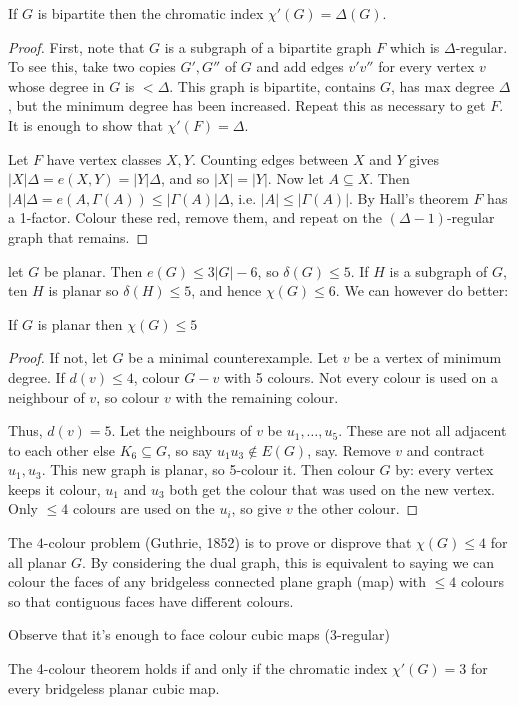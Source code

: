 \documentclass[10pt,a4paper]{article}
\begin{document}
\begin{theorem}
If $G$ is bipartite then the chromatic index $\chi'(G) = \Delta(G)$.
\end{theorem}
\begin{proof}
First, note that $G$ is a subgraph of a bipartite graph $F$ which is $\Delta$-regular. To see this, take two copies $G', G''$ of $G$ and add edges $v'v''$ for every vertex $v$ whose degree in $G$ is $<\Delta$. This graph is bipartite, contains $G$, has max degree $\Delta$, but the minimum degree has been increased. Repeat this as necessary to get $F$. It is enough to show that $\chi'(F) = \Delta$.

Let $F$ have vertex classes $X, Y$. Counting edges between $X$ and $Y$ gives $|X|\Delta = e(X,Y) = |Y|\Delta$, and so $|X|=|Y|$. Now let $A \subseteq X$. Then $|A|\Delta = e(A, \Gamma(A)) \leq |\Gamma(A)|\Delta$, i.e. $|A| \leq |\Gamma(A)|$. By Hall's theorem $F$ has a 1-factor. Colour these red, remove them, and repeat on the $(\Delta-1)$-regular graph that remains.
\end{proof}
let $G$ be planar. Then $e(G) \leq 3|G|-6$, so $\delta(G) \leq 5$. If $H$ is a subgraph of $G$, ten $H$ is planar so $\delta(H) \leq 5$, and hence $\chi(G) \leq 6$. We can however do better:
\begin{theorem}[Heawood 1890]
If $G$ is planar then $\chi(G) \leq 5$
\end{theorem}
\begin{proof}
If not, let $G$ be a minimal counterexample. Let $v$ be a vertex of minimum degree. If $d(v) \leq 4$, colour $G-v$ with 5 colours. Not every colour is used on a neighbour of $v$, so colour $v$ with the remaining colour.

Thus, $d(v) = 5$. Let the neighbours of $v$ be $u_1, \ldots, u_5$. These are not all adjacent to each other else $K_6 \subseteq G$, so say $u_1u_3 \notin E(G)$, say. Remove $v$ and contract $u_1, u_3$. This new graph is planar, so 5-colour it. Then colour $G$ by: every vertex keeps it colour, $u_1$ and $u_3$ both get the colour that was used on the new vertex. Only $\leq 4$ colours are used on the $u_i$, so give $v$ the other colour.
\end{proof}

The $4$-colour problem (Guthrie, 1852) is to prove or disprove that $\chi(G) \leq 4$ for all planar $G$. By considering the dual graph, this is equivalent to saying we can colour the faces of any bridgeless connected plane graph (map) with $\leq 4$ colours so that contiguous faces have different colours. 

Observe that it's enough to face colour cubic maps (3-regular)

\begin{theorem}[Tait 1880]
The 4-colour theorem holds if and only if the chromatic index $\chi'(G) = 3$ for every bridgeless planar cubic map.

\end{theorem}
\end{document}
